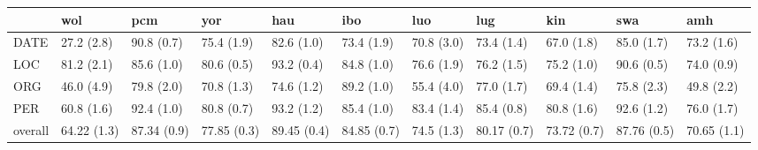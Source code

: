 \begin{tabular}{lllllllllll}
\toprule
{} &          wol &          pcm &          yor &          hau &          ibo &         luo &          lug &          kin &          swa &          amh \\
\midrule
DATE    &   27.2 (2.8) &   90.8 (0.7) &   75.4 (1.9) &   82.6 (1.0) &   73.4 (1.9) &  70.8 (3.0) &   73.4 (1.4) &   67.0 (1.8) &   85.0 (1.7) &   73.2 (1.6) \\
LOC     &   81.2 (2.1) &   85.6 (1.0) &   80.6 (0.5) &   93.2 (0.4) &   84.8 (1.0) &  76.6 (1.9) &   76.2 (1.5) &   75.2 (1.0) &   90.6 (0.5) &   74.0 (0.9) \\
ORG     &   46.0 (4.9) &   79.8 (2.0) &   70.8 (1.3) &   74.6 (1.2) &   89.2 (1.0) &  55.4 (4.0) &   77.0 (1.7) &   69.4 (1.4) &   75.8 (2.3) &   49.8 (2.2) \\
PER     &   60.8 (1.6) &   92.4 (1.0) &   80.8 (0.7) &   93.2 (1.2) &   85.4 (1.0) &  83.4 (1.4) &   85.4 (0.8) &   80.8 (1.6) &   92.6 (1.2) &   76.0 (1.7) \\
overall &  64.22 (1.3) &  87.34 (0.9) &  77.85 (0.3) &  89.45 (0.4) &  84.85 (0.7) &  74.5 (1.3) &  80.17 (0.7) &  73.72 (0.7) &  87.76 (0.5) &  70.65 (1.1) \\
\bottomrule
\end{tabular}
